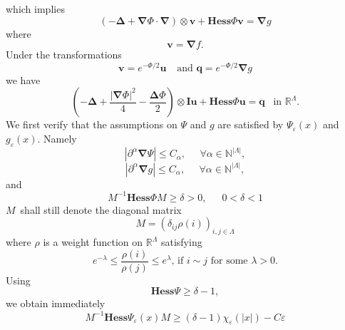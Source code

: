 \documentclass{article}
\begin{document}
which implies 
\begin{equation}
\left( -\mathbf{\Delta }+\mathbf{\nabla }\Phi \cdot \mathbf{\nabla }\right)
\otimes \mathbf{v}+\mathbf{Hess}\Phi \mathbf{v}=\mathbf{\nabla }g
\end{equation}%
where 
\begin{equation*}
\mathbf{v=\nabla }f.
\end{equation*}%
Under the transformations%
\begin{equation*}
\mathbf{v}=e^{-\Phi /2}\mathbf{u}\;\;\ \;\text{and \ \ \ \ }\mathbf{q}%
=e^{-\Phi /2}\mathbf{\nabla }g
\end{equation*}%
we have%
\begin{equation}
\left( \mathbf{-\Delta +}\frac{\left| \mathbf{\nabla }\Phi \right| ^{2}}{4}-%
\frac{\mathbf{\Delta }\Phi }{2}\right) \otimes \mathbf{Iu}+\mathbf{Hess}\Phi 
\mathbf{u}=\mathbf{q}\;\;\;\text{in }\mathbb{R}^{\Lambda }.
\end{equation}%
We first verify that the assumptions on $\Psi $ and $g$ are satisfied by $%
\Psi _{\varepsilon }(x)$ and $g_{\varepsilon }(x).$ Namely 
\begin{equation}
\left| \partial ^{\alpha }\mathbf{\nabla }\Psi \right| \leq C_{\alpha },\;\
\ \ \ \ \forall \alpha \in \mathbb{N}^{\left| \Lambda \right| },
\end{equation}%
\begin{equation}
\left| \partial ^{\alpha }\mathbf{\nabla }g\right| \leq C_{\alpha },\;\ \ \
\ \ \forall \alpha \in \mathbb{N}^{\left| \Lambda \right| },
\end{equation}%
and%
\begin{equation}
M^{-1}\mathbf{Hess}\Phi M\geq \delta >0,\;\;\;\text{ }0<\delta <1
\end{equation}%
$M$\ shall still denote the diagonal matrix%
\begin{equation*}
M=\left( \delta _{ij}\rho (i)\right) _{i,j\in \Lambda }
\end{equation*}%
where $\rho $ is a weight function on $\mathbb{R}^{\Lambda }$ satisfying \ 
\begin{equation}
e^{-\lambda }\leq \frac{\rho \left( i\right) }{\rho (j)}\leq e^{\lambda }%
\text{, \ \ if }i\sim j\text{\ \ for some }\lambda >0.
\end{equation}%
Using%
\begin{equation*}
\mathbf{Hess}\Psi \geq \delta -1,
\end{equation*}%
we obtain immediately 
\begin{equation}
M^{-1}\mathbf{Hess}\Psi _{\varepsilon }(x)M\geq \left( \delta -1\right) \chi
_{\varepsilon }(\left| x\right| )-C\varepsilon
\end{equation}%
\end{document}

